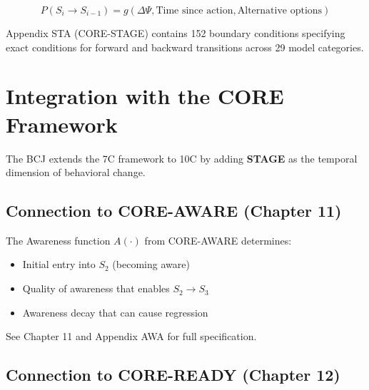 \begin{definition}
\begin{equation}
P(S_i \to S_{i-1}) = g(\Delta\Psi, \text{Time since action}, \text{Alternative options})
\label{eq:relapse-prob}
\end{equation}
\end{definition}

\begin{cross-reference}
Appendix STA (CORE-STAGE) contains 152 boundary conditions specifying
exact conditions for forward and backward transitions across 29 model categories.
\end{cross-reference}



\section{Integration with the CORE Framework}
\label{sec:bcj-integration}


The BCJ extends the 7C framework to 10C by adding \textbf{STAGE} as the
temporal dimension of behavioral change.

\subsection{Connection to CORE-AWARE (Chapter 11)}
\label{sec:bcj-awareness}

\begin{cross-reference}
The Awareness function $A(\cdot)$ from CORE-AWARE determines:
\begin{itemize}
    \item Initial entry into $S_2$ (becoming aware)
    \item Quality of awareness that enables $S_2 \to S_3$
    \item Awareness decay that can cause regression
\end{itemize}
See Chapter 11 and Appendix AWA for full specification.
\end{cross-reference}

\subsection{Connection to CORE-READY (Chapter 12)}
\label{sec:bcj-willingness}

